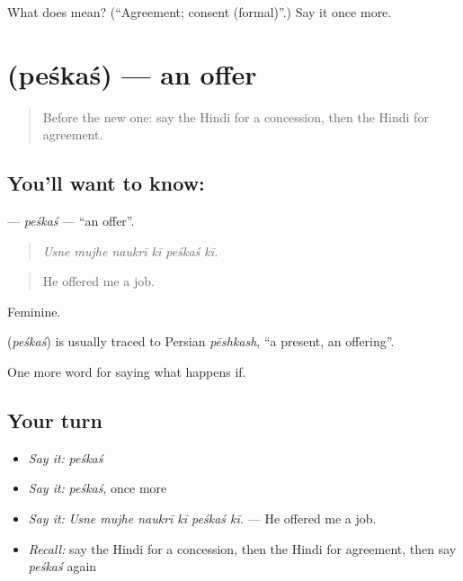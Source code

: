 \begin{tcolorbox}[breakable,colback=teal!4,colframe=teal!35!black,title={Before you move on}]
What does  mean? (\textquotedblleft{}Agreement; consent (formal)\textquotedblright{}.) Say it once more.
\end{tcolorbox}
\section[\texorpdfstring{\hi{पेशकश} (peśkaś)}{पेशकश (peśkaś)}]{ (peśkaś) — an offer}

\label{lesson:HI-C542-peskas}



\begin{quote}
Before the new one: say the Hindi for a concession, then the Hindi for agreement.
\end{quote}

\subsection*{You'll want to know: }
\textbf{} — \emph{peśkaś} — \textquotedblleft{}an offer\textquotedblright{}.

\begin{quote}
     
\end{quote}

\begin{quote}
\emph{Usne mujhe naukrī kī peśkaś kī.}
\end{quote}

\begin{quote}
He offered me a job.
\end{quote}

Feminine.

\begin{cousinweb}
\textbf{} (\emph{peśkaś}) is usually traced to Persian \emph{pēshkash}, \textquotedblleft{}a present, an offering\textquotedblright{}.
\end{cousinweb}

\begin{grammarlens}[title={What you've built}]
One more word for saying what happens if.
\end{grammarlens}

\subsection*{Your turn}
\begin{itemize}
\raggedright
  \item \emph{Say it:} \emph{peśkaś}
  \item \emph{Say it:} \emph{peśkaś}, once more
  \item \emph{Say it:} \emph{Usne mujhe naukrī kī peśkaś kī.} — He offered me a job.
  \item \emph{Recall:} say the Hindi for a concession, then the Hindi for agreement, then say \emph{peśkaś} again
\end{itemize}

